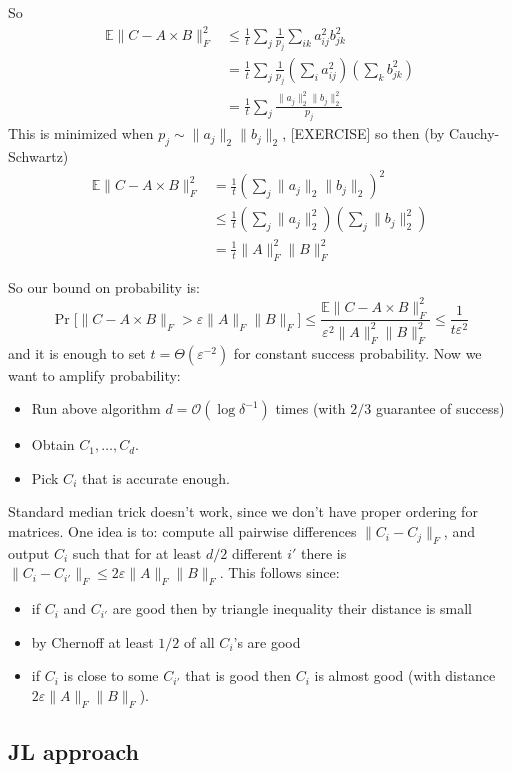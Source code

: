 \documentclass[11pt]{article}
\newcommand{\E}{{\mathbb E}}
\newcommand{\bigo}{\mathcal{O}}
\begin{document}
So
\begin{align*}
\E \| C - A \times B\|_F^2 &\le \frac{1}{t} \sum_j \frac{1}{p_j} \sum_{ik} a^2_{ij}b^2_{jk}\\
&=\frac{1}{t} \sum_j \frac{1}{p_j} \left(\sum_{i} a^2_{ij}\right)\left(\sum_k b^2_{jk}\right) \\
&=\frac{1}{t} \sum_j \frac{ \|a_j\|^2_2 \|b_j\|^2_2}{p_j} 
\end{align*}
This is minimized when $p_j \sim \|a_j\|_2 \|b_j\|_2$, [EXERCISE] so then (by Cauchy-Schwartz)
\begin{align*}
\E \| C - A \times B\|_F^2 &= \frac{1}{t} \left(\sum_j \|a_j\|_2 \|b_j\|_2\right)^2\\
&\le \frac{1}{t} \left(\sum_j \|a_j\|_2^2\right)\left(\sum_j \|b_j\|_2^2\right)\\
&= \frac{1}{t} \|A\|_F^2 \|B\|_F^2
\end{align*}

So our bound on probability is:
$$\Pr\Big[\| C - A \times B\|_F > \varepsilon \|A\|_F \|B\|_F\Big] \le \frac{\E \| C - A \times B\|_F^2}{ \varepsilon^2 \|A\|_F^2 \|B\|_F^2 }  \le \frac{1}{t \varepsilon^2}$$
and it is enough to set $t = \Theta(\varepsilon^{-2})$ for constant success probability.
Now we want to amplify probability:
\begin{itemize}
\item Run above algorithm $d = \bigo( \log \delta^{-1})$ times (with $2/3$ guarantee of success)
\item Obtain $C_1, \ldots, C_d$.
\item Pick $C_i$ that is accurate enough.
\end{itemize}

Standard median trick doesn't work, since we don't have proper ordering for matrices.
One idea is to: compute all pairwise differences $\|C_i - C_j\|_F$, and output $C_i$ such that for at least $d/2$ different $i'$ there is $\|C_{i} - C_{i'}\|_F \le 2 \varepsilon \|A\|_F \|B\|_F$. This follows since:
\begin{itemize}
\item if $C_i$ and $C_{i'}$ are good then by triangle inequality their distance is small
\item by Chernoff at least $1/2$ of all $C_i$'s are good
\item if $C_i$ is close to some $C_{i'}$ that is good then $C_i$ is almost good (with distance $2\varepsilon \|A\|_F \|B\|_F$).
\end{itemize}

\subsection{JL approach \cite{10.1109/FOCS.2006.37}}
\end{document}
